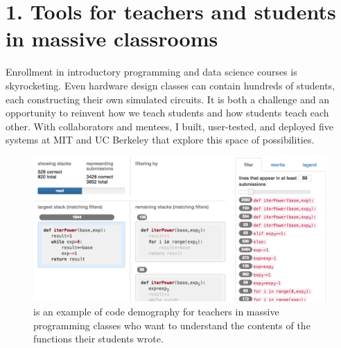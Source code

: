 \documentclass[justified]{tufte-handout}
\begin{document}
\section{1. Tools for teachers and students in massive classrooms}\label{sec:human}

Enrollment in introductory programming and data science courses is skyrocketing. Even hardware design classes can contain hundreds of students, each constructing their own simulated circuits. %
It is both a challenge and an opportunity to reinvent how we teach students and how students teach each other. With collaborators and mentees, I built, user-tested, and deployed five systems at MIT and UC Berkeley that explore this space of possibilities.%



\begin{figure}[h]
  \includegraphics[width=0.65\linewidth]{overcode.png}%
  \caption{ is an example of code demography for teachers in massive programming classes who want to understand the contents of the functions their students wrote.}%
  \label{fig:overcode}%
\end{figure}
\end{document}
